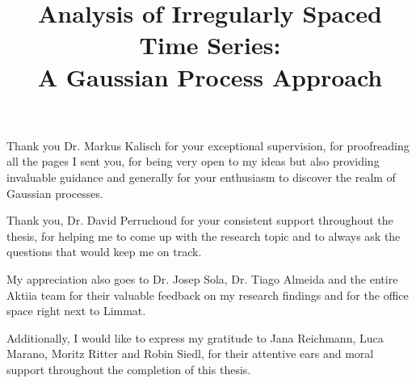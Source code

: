 \documentclass[11pt,a4paper,twoside,openright]{report}
\theoremstyle{definition}
\numberwithin{equation}{subsection}
\theoremstyle{definition}
\begin{document}


\title{Analysis of Irregularly Spaced Time Series:\\ A Gaussian Process Approach}

\maketitle%
\cleardoublepage

\markright{}
\begin{center}

Thank you Dr. Markus Kalisch for your exceptional
supervision, for proofreading all the pages I sent you,
for being very open to my ideas but also providing invaluable
guidance and generally for your enthusiasm to discover the realm of Gaussian
processes.

Thank you, Dr. David Perruchoud for your consistent support throughout the
thesis, for helping me to come up with the research topic and
to always ask the questions that would keep me on track.

My appreciation also goes to Dr. Josep Sola, Dr. Tiago Almeida and the
entire Aktiia team for their valuable feedback on my research findings and for
the office space right next to Limmat.

Additionally, I would like to express my gratitude to Jana Reichmann, Luca Marano,
Moritz Ritter and Robin Siedl, for their attentive ears and moral support
throughout the completion of this thesis.

\end{center}
\end{document}
